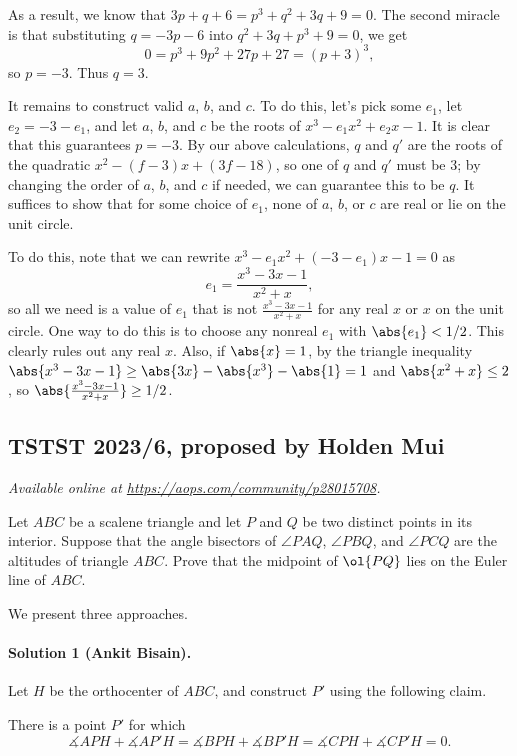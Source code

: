 \documentclass[11pt]{scrartcl}
\begin{document}
As a result, we know that $3p + q + 6 = p^3 + q^2 + 3q + 9 = 0$.
The second miracle is that substituting $q = -3p-6$ into
$q^2 + 3q + p^3 + 9 = 0$, we get
\[ 0 = p^3 + 9p^2 + 27p + 27 = (p + 3)^3, \]
so $p = -3$.
Thus $q = 3$.

It remains to construct valid $a$, $b$, and $c$.
To do this, let's pick some $e_1$, let $e_2 = -3 - e_1$,
and let $a$, $b$, and $c$ be the roots of $x^3 - e_1x^2 + e_2 x - 1$.
It is clear that this guarantees $p = -3$.
By our above calculations, $q$ and $q'$ are the roots of the quadratic
$x^2 - (f-3)x + (3f - 18)$, so one of $q$ and $q'$ must be $3$;
by changing the order of $a$, $b$, and $c$ if needed,
we can guarantee this to be $q$.
It suffices to show that for some choice of $e_1$,
none of $a$, $b$, or $c$ are real or lie on the unit circle.

To do this, note that we can rewrite $x^3 - e_1x^2 + (-3-e_1) x - 1 = 0$ as
\[ e_1 = \frac{x^3 - 3x - 1}{x^2 + x}, \]
so all we need is a value of $e_1$ that is not
$\frac{x^3 - 3x - 1}{x^2 + x}$ for any real $x$ or $x$ on the unit circle.
One way to do this is to choose any nonreal $e_1$ with $\abs{e_1} < 1/2$.
This clearly rules out any real $x$.
Also, if $\abs{x} = 1$, by the triangle inequality
$\abs{x^3 - 3x - 1} \geq \abs{3x} - \abs{x^3} - \abs{1} = 1$
and $\abs{x^2 + x} \leq 2$, so $\abs{\frac{x^3-3x-1}{x^2+x}} \geq 1/2$.
\pagebreak

\subsection{TSTST 2023/6, proposed by Holden Mui}
\textsl{Available online at \url{https://aops.com/community/p28015708}.}
\begin{mdframed}[style=mdpurplebox,frametitle={Problem statement}]
Let $ABC$ be a scalene triangle
and let $P$ and $Q$ be two distinct points in its interior.
Suppose that the angle bisectors of $\angle PAQ$, $\angle PBQ$,
and $\angle PCQ$ are the altitudes of triangle $ABC$.
Prove that the midpoint of $\ol{PQ}$ lies on the Euler line of $ABC$.
\end{mdframed}
We present three approaches.

\paragraph{Solution 1 (Ankit Bisain).}
Let $H$ be the orthocenter of $ABC$, and construct $P'$ using the following claim.

\begin{claim*}
    There is a point $P'$ for which \[\measuredangle APH + \measuredangle AP'H = \measuredangle BPH + \measuredangle BP'H = \measuredangle CPH + \measuredangle CP'H = 0.\]
\end{claim*}
\end{document}
